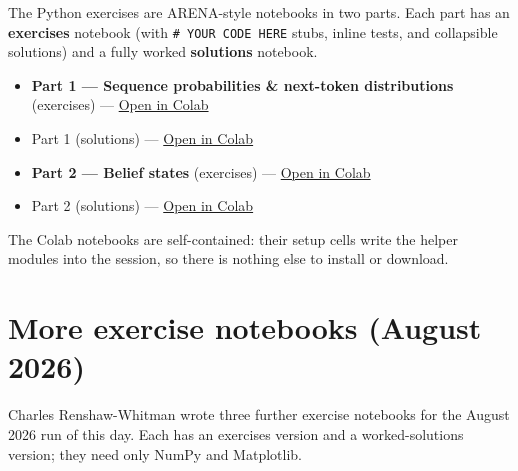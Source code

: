\documentclass[11pt]{article}
\begin{document}
The Python exercises are ARENA-style notebooks in two parts. Each part has an
\textbf{exercises} notebook (with \texttt{\# YOUR CODE HERE} stubs, inline tests, and
collapsible solutions) and a fully worked \textbf{solutions} notebook.

\begin{itemize}
\item
  \textbf{Part 1 --- Sequence probabilities \& next-token distributions} (exercises) --- \href{https://colab.research.google.com/github/iliad-team/iliad-intensive-C.3/blob/main/python-exercises/colab/part1_sequence_probabilities_exercises_colab.ipynb}{Open in Colab}
\item
  Part 1 (solutions) --- \href{https://colab.research.google.com/github/iliad-team/iliad-intensive-C.3/blob/main/python-exercises/colab/part1_sequence_probabilities_solutions_colab.ipynb}{Open in Colab}
\item
  \textbf{Part 2 --- Belief states} (exercises) --- \href{https://colab.research.google.com/github/iliad-team/iliad-intensive-C.3/blob/main/python-exercises/colab/part2_belief_states_exercises_colab.ipynb}{Open in Colab}
\item
  Part 2 (solutions) --- \href{https://colab.research.google.com/github/iliad-team/iliad-intensive-C.3/blob/main/python-exercises/colab/part2_belief_states_solutions_colab.ipynb}{Open in Colab}
\end{itemize}

The Colab notebooks are self-contained: their setup cells write the helper
modules into the session, so there is nothing else to install or download.

\section{More exercise notebooks (August 2026)}\label{sec:crw-notebooks}

Charles Renshaw-Whitman wrote three further exercise notebooks for the August
2026 run of this day. Each has an exercises version and a worked-solutions
version; they need only NumPy and Matplotlib.
\end{document}
